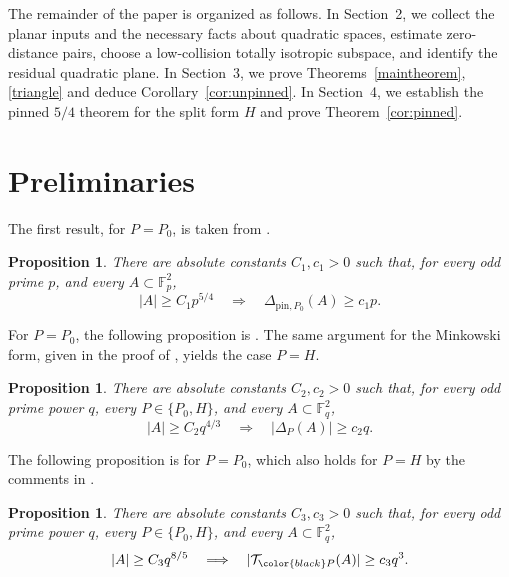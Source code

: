 \documentclass[11pt]{article}
\newtheorem{proposition}[theorem]{Proposition}
\newcommand{\F}{\mathbb F}
\begin{document}
The remainder of the paper is organized as follows.  In Section~2, we
collect the planar inputs and the necessary facts about quadratic spaces,
estimate zero-distance pairs, choose a low-collision totally isotropic
subspace, and identify the residual quadratic plane.  In Section~3, we
prove Theorems~\ref{maintheorem}, \ref{triangle} and deduce Corollary~\ref{cor:unpinned}. In Section~4, we establish the pinned
\(5/4\) theorem for the split form \(H\) and prove Theorem~\ref{cor:pinned}. 






\section{Preliminaries}

The first result, for $P=P_0$, is taken from \cite{MPPRS}.

\begin{proposition}
\label{prop:prime-planar-both_1}
There are absolute constants $C_1,c_1>0$ such that, for every odd prime $p$, and every $A\subset\F_p^2$,
\[
|A|\ge C_1p^{5/4} \quad\Longrightarrow\quad \Delta_{\mathrm{pin},P_0}(A)\ge c_1 p.
\]
\end{proposition}


For $P=P_0$, the following proposition is
\cite[Theorem~1.6, equation~(1.3)]{BHIPR}.  The same argument for
the Minkowski form, given in the proof of
\cite[Corollary~1.8]{BHIPR}, yields the case $P=H$.
\begin{proposition}
\label{prop:planar}
There are absolute constants $C_2,c_2>0$ such that, for every odd
prime power $q$, every $P\in\{P_0,H\}$, and every
$A\subset\F_q^2$,
\[
|A|\ge C_2q^{4/3} \quad\Longrightarrow\quad  |\Delta_P(A)|\ge c_2q.
\]
\end{proposition}





The following proposition is \cite[Theorem 1.5]{BHIPR} for $P=P_0$, which also holds for $P=H$ by the comments in \cite[Section 6]{BHIPR}. 


\begin{proposition}  \label{prop:planar-triangles}
There are absolute constants $C_3,c_3>0$ such that, for every odd prime power $q$, every $P\in\{P_0,H\}$, and every $A\subset\F_q^2$,
\[
|A|\geq C_3 q^{8/5} \quad\Longrightarrow\quad |\mathcal{T}_{\color{black} P}(A)|\geq c_3 q^3.
\]
\end{proposition}
\end{document}
